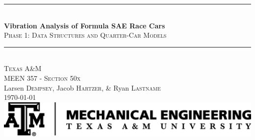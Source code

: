 \begin{titlepage}

\newcommand{\HRule}{\rule{\linewidth}{0.5mm}} %

\center %
 


\HRule \\[0.4cm]
{ \huge \bfseries Vibration Analysis of Formula SAE Race Cars}\\[0.4cm] %
\textsc{\large Phase 1: Data Structures and Quarter-Car Models}\\[0.5cm]
\HRule \\[1.5cm]


\textsc{\LARGE Texas A\&M}\\[.5cm] %
\textsc{\Large MEEN 357 - Section 50x}\\[1.5cm] %


Larsen \textsc{Dempsey}, Jacob \textsc{Hartzer}, \& Ryan \textsc{Lastname} \\[3cm] %



{\large \today}\\[2cm] %


\includegraphics{meen-logo-black.png}\\[1cm] %
 

\vfill %

\end{titlepage}


